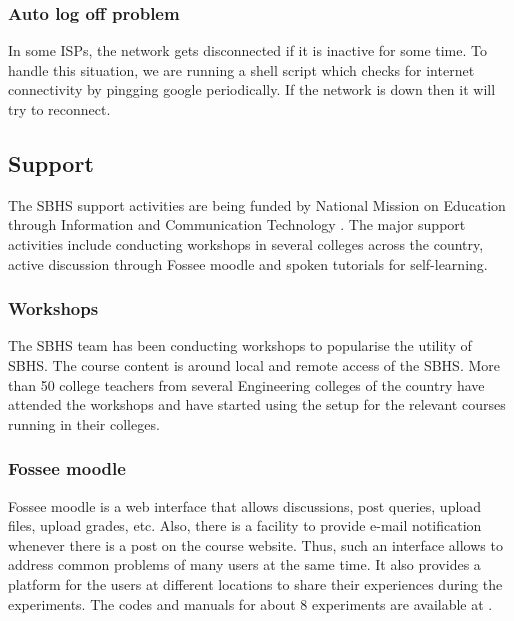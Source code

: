 \subsubsection { Auto log off problem}
In some ISPs, the network gets disconnected if it is inactive for some time. To handle this situation, we are running a shell script which checks for internet connectivity by pingging google periodically. If the network is down then it will try to reconnect.  




\subsection{Support}
The SBHS support activities are being funded by National Mission on Education through Information and Communication Technology \cite{kmm010}.  The major support activities include conducting workshops in several colleges across the country, active discussion through Fossee moodle and spoken tutorials for self-learning.

\subsubsection{Workshops}
The SBHS team has been conducting workshops to popularise the utility of SBHS.  The course content is around local and remote access of the SBHS. More than 50 college teachers from several Engineering colleges of the country have attended the workshops and have started using the setup for the relevant courses running in their colleges.

\subsubsection{Fossee moodle}


Fossee moodle is a web interface that allows discussions, post queries, upload files, upload grades, etc.  Also, there is a facility to provide e-mail notification whenever there is a post on the course website. Thus, such an interface allows to address common problems of many users at the same time. It also provides a platform for the users at different locations to share their experiences during the experiments.  The codes and manuals for about 8 experiments are available at \cite{moodle}.


